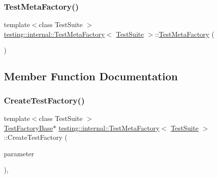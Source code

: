\subsubsection{\texorpdfstring{TestMetaFactory()}{TestMetaFactory()}\hspace{0.1cm}{\footnotesize\ttfamily [3/3]}}
{\footnotesize\ttfamily template$<$class Test\+Suite $>$ \\
\mbox{\hyperlink{classtesting_1_1internal_1_1_test_meta_factory}{testing\+::internal\+::\+Test\+Meta\+Factory}}$<$ \mbox{\hyperlink{classtesting_1_1_test_suite}{Test\+Suite}} $>$\+::\mbox{\hyperlink{classtesting_1_1internal_1_1_test_meta_factory}{Test\+Meta\+Factory}} (\begin{DoxyParamCaption}{ }\end{DoxyParamCaption})\hspace{0.3cm}{\ttfamily [inline]}}



\subsection{Member Function Documentation}
\mbox{\label{classtesting_1_1internal_1_1_test_meta_factory_abd5d30fab71229deb5e63f5bb5ea3fd8}} 
\subsubsection{\texorpdfstring{CreateTestFactory()}{CreateTestFactory()}\hspace{0.1cm}{\footnotesize\ttfamily [1/3]}}
{\footnotesize\ttfamily template$<$class Test\+Suite $>$ \\
\mbox{\hyperlink{classtesting_1_1internal_1_1_test_factory_base}{Test\+Factory\+Base}}$\ast$ \mbox{\hyperlink{classtesting_1_1internal_1_1_test_meta_factory}{testing\+::internal\+::\+Test\+Meta\+Factory}}$<$ \mbox{\hyperlink{classtesting_1_1_test_suite}{Test\+Suite}} $>$\+::Create\+Test\+Factory (\begin{DoxyParamCaption}\item[{\mbox{\hyperlink{classtesting_1_1internal_1_1_test_meta_factory_a392ebab15dfdcfa1b54bbe15878aa9cd}{Param\+Type}}}]{parameter }\end{DoxyParamCaption})\hspace{0.3cm}{\ttfamily [inline]}, {\ttfamily [override]}}

